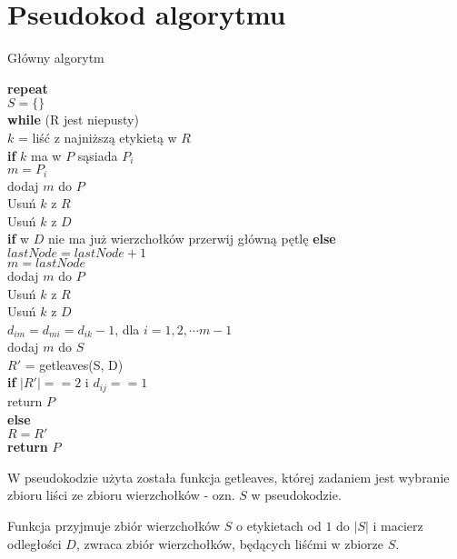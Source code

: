 \documentclass[a4paper,12p]{article}
\newcommand\tab[1][1cm]{\hspace*{#1}}
\begin{document}
\newpage

\section{Pseudokod algorytmu}

\begin{algorithm}
		\caption{Główny algorytm}
		\label{algo}
		\textbf{repeat} \\
		\tab  $S = \{ \}$ \\
		\tab \textbf{while} (R jest niepusty) \\
		\tab \tab $k$ = liść z najniższą etykietą w $R$ \\
		\tab \tab \textbf{if} $k$ ma w $P$ sąsiada $P_i$ \\
		\tab \tab \tab $m = P_i$ \\
		\tab \tab \tab dodaj $m$ do $P$ \\
		\tab \tab \tab Usuń $k$ z $R$ \\
		\tab \tab \tab Usuń $k$ z $D$ \\
		\tab \tab \tab \textbf{if} w $D$ nie ma już wierzchołków
		\tab \tab \tab przerwij główną pętlę
		\tab \tab \textbf{else} \\
		\tab \tab \tab $lastNode = lastNode + 1$ \\
		\tab \tab \tab $m = lastNode$ \\
		\tab \tab \tab dodaj $m$ do $P$ \\
		\tab \tab \tab Usuń $k$ z $R$ \\
		\tab \tab \tab Usuń $k$ z $D$ \\
		\tab \tab \tab $d_{im} = d_{mi} = d_{ik} - 1$, dla $i = 1, 2, \cdots m-1$ \\
		\tab \tab \tab dodaj $m$ do $S$ \\
		\tab  $R'$ = getleaves(S, D) \\
		\tab \textbf{if} $|R'| == 2$ i $d_{ij} == 1$ \\
		\tab \tab return $P$ \\
		\tab \textbf{else} \\
		\tab \tab $R = R'$ \\
		\textbf{return} $P$ \\
\end{algorithm}

W pseudokodzie użyta została funkcja getleaves, której zadaniem jest wybranie zbioru liści ze zbioru wierzchołków - ozn. $S$ w pseudokodzie.

Funkcja przyjmuje zbiór wierzchołków $S$ o etykietach od $1$ do $|S|$ i macierz odległości $D$, zwraca zbiór wierzchołków, będących liśćmi w zbiorze $S$.
\end{document}
